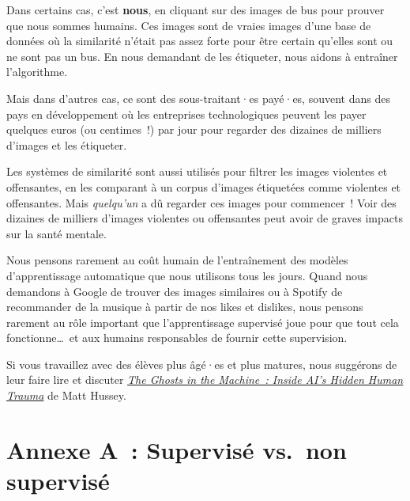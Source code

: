 \documentclass[12pt,a4paper]{article}
\begin{document}
\begin{keypointbox}
  Dans certains cas, c'est \textbf{nous}, en cliquant sur des images de bus pour prouver que nous sommes humains. Ces images sont de vraies images d'une base de données où la similarité n'était pas assez forte pour être certain qu'elles sont ou ne sont pas un bus. En nous demandant de les étiqueter, nous aidons à entraîner l'algorithme.

  Mais dans d'autres cas, ce sont des sous-traitant·es payé·es, souvent dans des pays en développement où les entreprises technologiques peuvent les payer quelques euros (ou centimes~!) par jour pour regarder des dizaines de milliers d'images et les étiqueter.

  Les systèmes de similarité sont aussi utilisés pour filtrer les images violentes et offensantes, en les comparant à un corpus d'images étiquetées comme violentes et offensantes. Mais \emph{quelqu'un} a dû regarder ces images pour commencer~! Voir des dizaines de milliers d'images violentes ou offensantes peut avoir de graves impacts sur la santé mentale.

  Nous pensons rarement au coût humain de l'entraînement des modèles d'apprentissage automatique que nous utilisons tous les jours. Quand nous demandons à Google de trouver des images similaires ou à Spotify de recommander de la musique à partir de nos likes et dislikes, nous pensons rarement au rôle important que l'apprentissage supervisé joue pour que tout cela fonctionne…~et aux humains responsables de fournir cette supervision.
\end{keypointbox}

\begin{instructornotes}
  Si vous travaillez avec des élèves plus âgé·es et plus matures, nous suggérons de leur faire lire et discuter \href{https://www.thebrink.me/the-ghosts-in-the-machine-inside-ai-hidden-human-trauma/}{\emph{The Ghosts in the Machine~: Inside AI's Hidden Human Trauma}} de Matt Hussey.
\end{instructornotes}

\newpage

\section*{Annexe A~: Supervisé vs.\ non supervisé}
\end{document}
